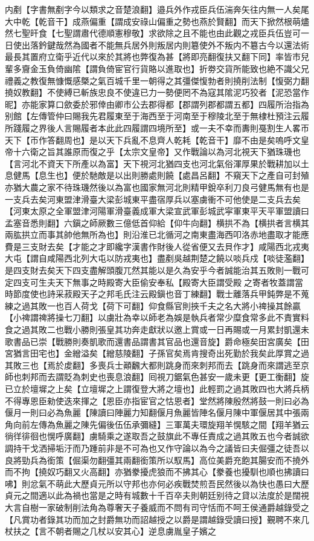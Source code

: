 内剷【字書無剷字今以類求之音楚浪翻】邉兵外作戎臣兵伍湍奔矢往内無一人矣尾大中乾【乾音干】成燕偏重【謂成安祿山偏重之勢也燕於賢翻】而天下掀然根萌燼然七聖旰食【七聖謂肅代德順憲穆敬】求欲除之且不能也由此觀之戎臣兵伍豈可一日使出落鈐鍵哉然為國者不能無兵居外則叛居内則簒使外不叛内不簒古今以還法術最長其置府立衛乎近代以來於其將也弊復為甚【將即亮翻復扶又翻下同】率皆市兒輩多齎金玉負倚幽隂【謂負倚宦官行貨賂以進取也】折劵交貨所能致也絶不識父兄禮義之教復無慷慨感槩之氣百城千里一朝得之其彊傑愎勃者則撓削法制【愎弼力翻撓奴教翻】不使縛已斬族忠良不使違已力一勢便罔不為寇其隂泥巧狡者【泥恐當作昵】亦能家算口歛委於邪倖由卿市公去郡得都【郡謂列郡都謂五都】四履所治指為别館【左傳管仲曰賜我先君履東至于海西至于河南至于穆陵北至于無棣杜預注云履所踐履之界後人言賜履者本此此四履謂四境所至】或一夫不幸而夀則戞割生人畧帀天下【帀作答翻周也】是以天下兵亂不息齊人乾耗【乾音干】靡不由是矣嗚呼文皇帝十六衛之旨其誰原而復之乎【太宗文皇帝】又作戰論以為河北視天下猶珠璣也【言河北不資天下所產以為富】天下視河北猶四支也河北氣俗渾厚果於戰耕加以土息健馬【息生也】便於馳敵是以出則勝處則饒【處昌呂翻】不窺天下之產自可封殖亦猶大農之家不待珠璣然後以為富也國家無河北則精甲銳卒利刀良弓健馬無有也是一支兵去矣河東盟津滑臺大梁彭城東平盡宿厚兵以塞虜衝不可他使是二支兵去矣【河東太原之全軍盟津河陽軍滑臺義成軍大梁宣武軍彭城武寜軍東平天平軍盟讀曰孟塞音悉則翻】六鎭之師厥數三億低首仰給【仰牛向翻】横拱不為【横拱者言横其兩肱拱立而事其帥他無所為也】則沿淮已北循河之南東盡海西叩洛赤地盡取才能應費是三支財去矣【才能之才即纔字漢書作財後人從省便又去貝作才】咸陽西北戎夷大屯【謂自咸陽西北列大屯以防戎夷也】盡剷吳越荆楚之饒以啖兵戍【啖徒濫翻】是四支財去矣天下四支盡解頭腹兀然其能以是久為安乎今者誠能治其五敗則一戰可定四支可生夫天下無事之時殿寄大臣偷安奉私【殿寄大臣謂受殿之寄者牧蓋謂當時節度使也詩采菽殿天子之邦毛氏注云殿鎭也音丁練翻】戰士離落兵甲鈍弊是不蒐練之過其敗一也百人荷戈【荷下可翻】仰食縣官則挾千夫之名大將小禆操其餘贏【小禆謂禆將操七刀翻】以虜壯為幸以師老為娛是執兵者常少糜食常多此不責實料食之過其敗二也戰小勝則張皇其功奔走獻狀以邀上賞或一日再賜或一月累封凱還未歌書品已崇【戰勝則奏凱歌而還書品謂書其官品也還音旋】爵命極矣田宮廣矣【田宮猶言田宅也】金繒溢矣【繒慈陵翻】子孫官矣焉肯搜奇出死勤於我矣此厚賞之過其敗三也【焉於䖍翻】多喪兵士顚飜大都則跳身而來刺邦而去【跳身而來謂逃至京師也刺邦而去謂貶為刺史也喪息浪翻】囘視刀鋸氣色甚安一歲未更【更工衡翻】旋已立於壇墀之上矣【立壇墀之上謂復登大將之壇也】此輕罰之過其敗四也大將兵柄不得專恩臣勑使迭來揮之【恩臣亦指宦官之怙恩者】堂然將陳殷然將鼓一則曰必為偃月一則曰必為魚麗【陳讀曰陣麗力知翻偃月魚麗皆陣名偃月陳中軍偃居其中張兩角向前左傳為魚麗之陳先偏後伍伍承彌縫】三軍萬夫環旋翔羊愰駭之間【翔羊猶云徜徉徘徊也愰呼廣翻】虜騎乘之遂取吾之鼓旗此不專任責成之過其敗五也今者誠欲調持干戈洒掃垢汙而乃踵前非是不可為也又作守論以為今之議皆曰夫倔彊之徒吾以良將勁兵為銜策【倔渠勿翻彊其兩翻銜策所以馭馬】高位美爵充飽其腸安而不撓外而不拘【撓奴巧翻又火高翻】亦猶豢擾虎狼而不拂其心【豢養也擾馴也順也拂讀曰咈】則忿氣不萌此大歷貞元所以守邦也亦何必疾戰焚煎吾民然後以為快也愚曰大歷貞元之間適以此為禍也當是之時有城數十千百卒夫則朝廷别待之貸以法度於是闊視大言自樹一家破制削法角為尊奢天子養威而不問有司守恬而不呵王侯通爵越錄受之【凡賞功者錄其功而加之封爵無功而詔越授之以爵是謂越錄受讀曰授】覲聘不來几杖扶之【言不朝者賜之几杖以安其心】逆息虜胤皇子嬪之